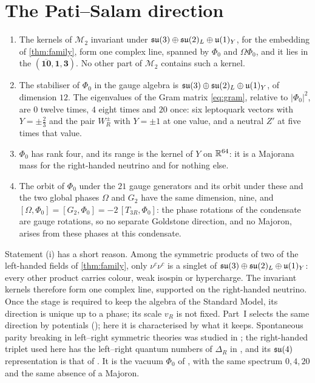 \section{The Pati--Salam direction}

\begin{theorem}
\label{thm:psstage}
\begin{enumerate}[label=(\roman*),leftmargin=2.2em,itemsep=1pt]
\item The kernels of $\mathcal M_2$ invariant under $\mathfrak{su}(3)\oplus\mathfrak{su}(2)_L\oplus\mathfrak{u}(1)_Y$, for the embedding of \cref{thm:family}, form one complex
line, spanned by $\Phi_0$ and $\Omega\Phi_0$, and it lies in the $(\overline{\mathbf{10}},\mathbf1,\mathbf3)$. No other part of
$\mathcal M_2$ contains such a kernel.
\item The stabiliser of $\Phi_0$ in the gauge algebra is $\mathfrak{su}(3)\oplus\mathfrak{su}(2)_L\oplus\mathfrak{u}(1)_Y$, of dimension $12$. The eigenvalues of the Gram
matrix \cref{eq:gram}, relative to $|\Phi_0|^2$, are $0$ twelve times, $4$ eight times and $20$ once: six leptoquark vectors with
$Y=\pm\tfrac23$ and the pair $W_R^\pm$ with $Y=\pm1$ at one value, and a neutral $Z'$ at five times that value.
\item $\Phi_0$ has rank four, and its range is the kernel of $Y$ on $\mathbb{R}^{64}$: it is a Majorana mass for the right-handed neutrino and for
nothing else.
\item The orbit of $\Phi_0$ under the $21$ gauge generators and its orbit under these and the two global phases $\Omega$ and $G_2$ have the
same dimension, nine, and $[\Omega,\Phi_0]=[G_2,\Phi_0]=-2\,[T_{3R},\Phi_0]$: the phase rotations of the condensate are gauge rotations, so
no separate Goldstone direction, and no Majoron, arises from these phases at this condensate.
\end{enumerate}
\end{theorem}

Statement (i) has a short reason. Among the symmetric products of two of the left-handed fields of \cref{thm:family}, only
$\nu^c\nu^c$ is a singlet of $\mathfrak{su}(3)\oplus\mathfrak{su}(2)_L\oplus\mathfrak{u}(1)_Y$: every other product carries colour, weak isospin or hypercharge. The invariant
kernels therefore form one complex line, supported on the right-handed neutrino. Once the stage is required to keep the algebra of the
Standard Model, its direction is unique up to a phase; its scale $v_R$ is not fixed. Part~I selects the same direction by potentials
(); here it is characterised by what it keeps. Spontaneous parity breaking in left--right
symmetric theories was studied in \cite{SenjanovicMohapatra75}; the right-handed triplet used here has the left--right quantum numbers of
$\Delta_R$ in \cite[eq.~(2.4)]{MohapatraSenjanovic81}, and its $\mathfrak{su}(4)$ representation is that of \cite[eqs.~(3.5)--(3.7)]{DingKingLu2021}.
It is the vacuum $\Phi_0$ of , with the same spectrum $0,4,20$ and the same absence of a Majoron.


